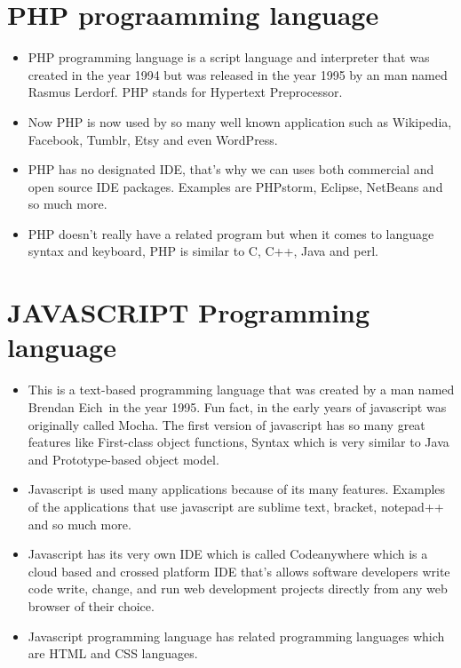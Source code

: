 \documentclass{article}
\begin{document}
\section{PHP prograamming language}
\begin{itemize}
	\item PHP programming language is a script language and interpreter that  was created in the year 1994 but was released in the year 1995 by an man named Rasmus Lerdorf. PHP stands for Hypertext Preprocessor.
	\item Now PHP is now used by so many well known application such as Wikipedia, Facebook, Tumblr, Etsy and even WordPress.
	\item PHP has no designated IDE, that’s why we can uses both commercial and open source IDE packages. Examples are PHPstorm, Eclipse, NetBeans and so much more.
	\item PHP doesn’t really have a related program but when it comes to language syntax and keyboard, PHP is similar to C, C++, Java and perl.
	
\end{itemize}
\newpage
\section{JAVASCRIPT Programming language} 
\begin{itemize}
\item This is a text-based programming language that was created by a man named Brendan Eich in the year 1995. Fun fact, in the early years of javascript was originally called Mocha. The first version of javascript has so many great features like First-class object functions, Syntax which is very similar to Java and Prototype-based object model.
\item Javascript is used many applications because of its many features. Examples of the applications that use javascript are sublime text, bracket, notepad++ and so much more.
\item Javascript has its very own IDE which is called Codeanywhere which is a cloud based and crossed platform IDE that’s allows software developers write code write, change, and run web development projects directly from any web browser of their choice. 
\item Javascript programming language has related programming languages which are HTML and CSS languages.
 
\end{itemize}
\newpage
\end{document}

